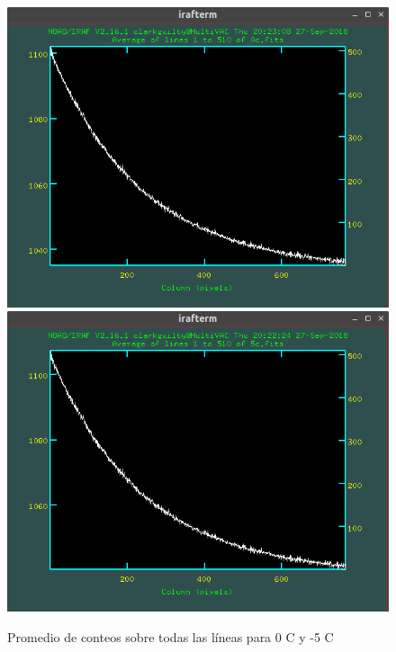 \documentclass[12pt]{article}
\begin{document}
\begin{figure}[H]
   \includegraphics[scale=0.4]{0c.png}
   \includegraphics[scale=0.4]{5c.png}
  \caption{Promedio de conteos sobre todas las líneas para 0 \degree C y -5 \degree C }
  \label{im0}
\end{figure}
\end{document}
